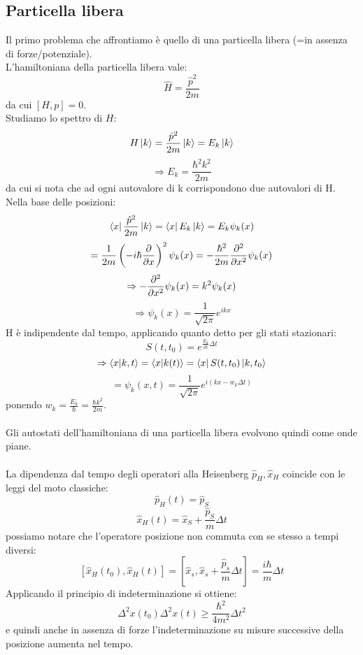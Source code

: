 \documentclass{article}
\begin{document}
\subsection{Particella libera}
Il primo problema che affrontiamo è quello di una particella libera (=in assenza di forze/potenziale).\\
L'hamiltoniana della particella libera vale:
$$ \hat{H}=\frac{\hat{p}^2}{2m} $$
da cui $[H,p]=0$.\\
Studiamo lo spettro di $H$:
$$ H\ket{k}=\frac{\hat{p}^2}{2m}\ket{k}=E_k\ket{k}$$
$$ \Rightarrow E_k=\frac{\hbar^2k^2}{2m} $$
da cui si nota che ad ogni autovalore di k corrispondono due autovalori di H.\\
Nella base delle posizioni:
$$ \bra{x}\frac{\hat{p}^2}{2m}\ket{k}=\bra{x}E_k\ket{k}=E_k\psi_k(x) $$
$$ =\frac{1}{2m}\left( -i\hbar\pdv{}{x} \right)^2\psi_k(x)=-\frac{\hbar^2}{2m}\pdv{^2}{x^2}\psi_k(x) $$
$$\Rightarrow-\pdv{^2}{x^2}\psi_k(x)=k^2\psi_k(x)$$
$$\Rightarrow\psi_k(x)=\frac{1}{\sqrt{2\pi}}e^{ikx}$$
H è indipendente dal tempo, applicando quanto detto per gli stati stazionari:
$$S(t,t_0)=e^{\frac{E_k}{i\hbar}\Delta t}$$
$$\Rightarrow \bra{x}\ket{k,t}=\bra{x}\ket{k(t)}=\bra{x}S(t,t_0)\ket{k,t_0}$$
$$=\psi_k(x,t)=\frac{1}{\sqrt{2\pi}}e^{i\left(kx-w_k\Delta t \right)}$$
ponendo $w_k=\frac{E_k}{\hbar}=\frac{\hbar k^2}{2m}$.\\\\
Gli autostati dell'hamiltoniana di una particella libera evolvono quindi come onde piane.\\\\
La dipendenza dal tempo degli operatori alla Heisenberg $\hat{p}_H,\hat{x}_H$ coincide con le leggi del moto classiche:
$$ \hat{p}_H(t)=\hat{p}_S $$
$$ \hat{x}_H(t)=\hat{x}_S+\frac{\hat{p}_S}{m}\Delta t $$
possiamo notare che l'operatore posizione non commuta con se stesso a tempi diversi:
$$ [\hat{x}_H(t_0),\hat{x}_H(t)]=[\hat{x}_s,\hat{x}_s+\frac{\hat{p}_s}{m}\Delta t]=\frac{i\hbar}{m}\Delta t $$
Applicando il principio di indeterminazione si ottiene:
$$ \Delta^2x(t_0)\Delta^2x(t)\geq\frac{\hbar^2}{4m^2}\Delta t^2 $$
e quindi anche in assenza di forze l'indeterminazione su misure successive della posizione aumenta nel tempo.
\end{document}
